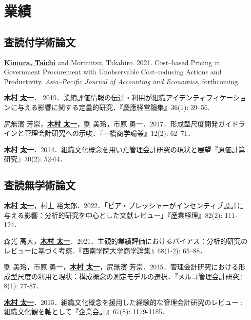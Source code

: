 \documentclass[letterpaper,uplatex]{article}
\renewenvironment{itemize}{
  \begin{list}{}{
    \setlength{\leftmargin}{1.5em}
  }
}{
  \end{list}
}
\begin{document}
\section*{業績}

\subsection*{査読付学術論文}

\begin{itemize}
    \item \underline{\textbf{Kimura, Taichi}} and Morimitsu, Takahiro. 2021. Cost--based Pricing in Government Procurement with Unobservable Cost--reducing Actions and Productivity. \textit{Asia--Pacific Journal of Accounting and Economics}, forthcoming.
    
    \item \underline{\textbf{木村 太一}}． 2019．業績評価情報の伝達・利用が組織アイデンティフィケーションに与える影響に関する定量的研究．『慶應経営論集』36(1): 39--56.

	\item 尻無濱 芳崇，\underline{\textbf{木村 太一}}，劉 美玲，市原 勇一．2017．形成型尺度開発ガイドラインと管理会計研究への示唆．『一橋商学論叢』12(2): 62--71．

	\item \underline{\textbf{木村 太一}}．2014．組織文化概念を用いた管理会計研究の現状と展望『原価計算研究』30(2): 52-64．
\end{itemize}

\subsection*{査読無学術論文}

\begin{itemize}
    \item \underline{\textbf{木村 太一}}，村上 裕太郎．2022．「ピア・プレッシャーがインセンティブ設計に与える影響：分析的研究を中心とした文献レビュー」『産業経理』82(2): 111-124．

    \item 森光 高大，\underline{\textbf{木村 太一}}．2021．主観的業績評価におけるバイアス：分析的研究のレビューに基づく考察．『西南学院大学商学論集』68(1-2): 65--88．
    
	\item 劉 美玲，市原 勇一，\underline{\textbf{木村 太一}}，尻無濱 芳崇．2015．管理会計研究における形成型尺度の利用と現状：構成概念の測定モデルの選択．『メルコ管理会計研究』8(1): 77-87．

	\item \underline{\textbf{木村 太一}}．2015．組織文化概念を援用した経験的な管理会計研究のレビュー : 組織文化観を軸として『企業会計』67(8): 1179-1185．
\end{itemize}
\end{document}
